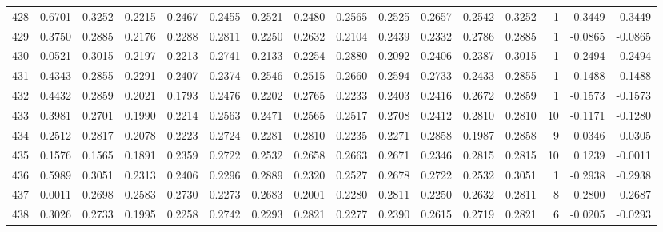 \begin{tabular}{lrrrrrrrrrrrrrrr}
428 &      0.6701 &  0.3252 &  0.2215 &  0.2467 &  0.2455 &  0.2521 &  0.2480 &  0.2565 &  0.2525 &  0.2657 &   0.2542 &     0.3252 &      1 &                   -0.3449 &                    -0.3449 \\
429 &      0.3750 &  0.2885 &  0.2176 &  0.2288 &  0.2811 &  0.2250 &  0.2632 &  0.2104 &  0.2439 &  0.2332 &   0.2786 &     0.2885 &      1 &                   -0.0865 &                    -0.0865 \\
430 &      0.0521 &  0.3015 &  0.2197 &  0.2213 &  0.2741 &  0.2133 &  0.2254 &  0.2880 &  0.2092 &  0.2406 &   0.2387 &     0.3015 &      1 &                    0.2494 &                     0.2494 \\
431 &      0.4343 &  0.2855 &  0.2291 &  0.2407 &  0.2374 &  0.2546 &  0.2515 &  0.2660 &  0.2594 &  0.2733 &   0.2433 &     0.2855 &      1 &                   -0.1488 &                    -0.1488 \\
432 &      0.4432 &  0.2859 &  0.2021 &  0.1793 &  0.2476 &  0.2202 &  0.2765 &  0.2233 &  0.2403 &  0.2416 &   0.2672 &     0.2859 &      1 &                   -0.1573 &                    -0.1573 \\
433 &      0.3981 &  0.2701 &  0.1990 &  0.2214 &  0.2563 &  0.2471 &  0.2565 &  0.2517 &  0.2708 &  0.2412 &   0.2810 &     0.2810 &     10 &                   -0.1171 &                    -0.1280 \\
434 &      0.2512 &  0.2817 &  0.2078 &  0.2223 &  0.2724 &  0.2281 &  0.2810 &  0.2235 &  0.2271 &  0.2858 &   0.1987 &     0.2858 &      9 &                    0.0346 &                     0.0305 \\
435 &      0.1576 &  0.1565 &  0.1891 &  0.2359 &  0.2722 &  0.2532 &  0.2658 &  0.2663 &  0.2671 &  0.2346 &   0.2815 &     0.2815 &     10 &                    0.1239 &                    -0.0011 \\
436 &      0.5989 &  0.3051 &  0.2313 &  0.2406 &  0.2296 &  0.2889 &  0.2320 &  0.2527 &  0.2678 &  0.2722 &   0.2532 &     0.3051 &      1 &                   -0.2938 &                    -0.2938 \\
437 &      0.0011 &  0.2698 &  0.2583 &  0.2730 &  0.2273 &  0.2683 &  0.2001 &  0.2280 &  0.2811 &  0.2250 &   0.2632 &     0.2811 &      8 &                    0.2800 &                     0.2687 \\
438 &      0.3026 &  0.2733 &  0.1995 &  0.2258 &  0.2742 &  0.2293 &  0.2821 &  0.2277 &  0.2390 &  0.2615 &   0.2719 &     0.2821 &      6 &                   -0.0205 &                    -0.0293 \\

\end{tabular}
